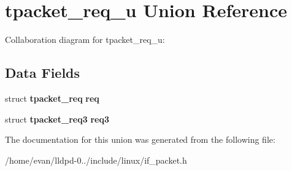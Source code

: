 \section{tpacket\-\_\-req\-\_\-u \-Union \-Reference}
\label{uniontpacket__req__u}


\-Collaboration diagram for tpacket\-\_\-req\-\_\-u\-:
\subsection*{\-Data \-Fields}
\begin{DoxyCompactItemize}
\item 
struct {\bf tpacket\-\_\-req} {\bfseries req}\label{uniontpacket__req__u_a3bff69491835d598cd73c2d17d627311}

\item 
struct {\bf tpacket\-\_\-req3} {\bfseries req3}\label{uniontpacket__req__u_af9f0335b271cf29567e49df1c0df8f7c}

\end{DoxyCompactItemize}


\-The documentation for this union was generated from the following file\-:\begin{DoxyCompactItemize}
\item 
/home/evan/lldpd-\/0../include/linux/if\-\_\-packet.\-h\end{DoxyCompactItemize}
